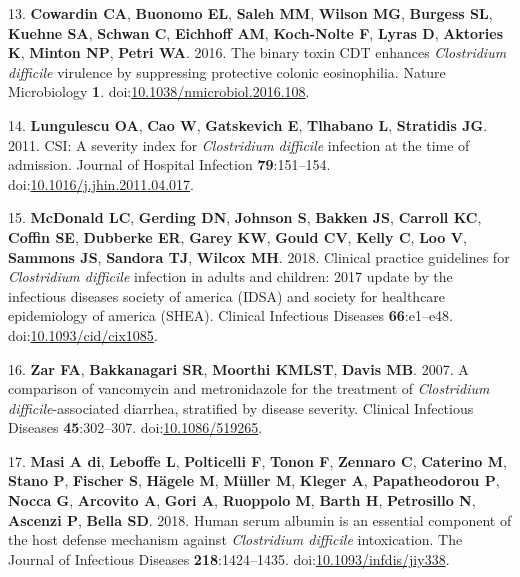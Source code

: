 \documentclass[
  12pt,
]{article}
\newenvironment{cslreferences}%
  {}%
  {\par}
\begin{document}
\begin{cslreferences}
\leavevmode\hypertarget{ref-Cowardin2016}{}%
13. \textbf{Cowardin CA}, \textbf{Buonomo EL}, \textbf{Saleh MM},
\textbf{Wilson MG}, \textbf{Burgess SL}, \textbf{Kuehne SA},
\textbf{Schwan C}, \textbf{Eichhoff AM}, \textbf{Koch-Nolte F},
\textbf{Lyras D}, \textbf{Aktories K}, \textbf{Minton NP}, \textbf{Petri
WA}. 2016. The binary toxin CDT enhances \emph{Clostridium difficile}
virulence by suppressing protective colonic eosinophilia. Nature
Microbiology \textbf{1}.
doi:\href{https://doi.org/10.1038/nmicrobiol.2016.108}{10.1038/nmicrobiol.2016.108}.

\leavevmode\hypertarget{ref-Lungulescu2011}{}%
14. \textbf{Lungulescu OA}, \textbf{Cao W}, \textbf{Gatskevich E},
\textbf{Tlhabano L}, \textbf{Stratidis JG}. 2011. CSI: A severity index
for \emph{Clostridium difficile} infection at the time of admission.
Journal of Hospital Infection \textbf{79}:151--154.
doi:\href{https://doi.org/10.1016/j.jhin.2011.04.017}{10.1016/j.jhin.2011.04.017}.

\leavevmode\hypertarget{ref-McDonald2018}{}%
15. \textbf{McDonald LC}, \textbf{Gerding DN}, \textbf{Johnson S},
\textbf{Bakken JS}, \textbf{Carroll KC}, \textbf{Coffin SE},
\textbf{Dubberke ER}, \textbf{Garey KW}, \textbf{Gould CV},
\textbf{Kelly C}, \textbf{Loo V}, \textbf{Sammons JS}, \textbf{Sandora
TJ}, \textbf{Wilcox MH}. 2018. Clinical practice guidelines for
\emph{Clostridium difficile} infection in adults and children: 2017
update by the infectious diseases society of america (IDSA) and society
for healthcare epidemiology of america (SHEA). Clinical Infectious
Diseases \textbf{66}:e1--e48.
doi:\href{https://doi.org/10.1093/cid/cix1085}{10.1093/cid/cix1085}.

\leavevmode\hypertarget{ref-Zar2007}{}%
16. \textbf{Zar FA}, \textbf{Bakkanagari SR}, \textbf{Moorthi KMLST},
\textbf{Davis MB}. 2007. A comparison of vancomycin and metronidazole
for the treatment of \emph{Clostridium difficile}-associated diarrhea,
stratified by disease severity. Clinical Infectious Diseases
\textbf{45}:302--307.
doi:\href{https://doi.org/10.1086/519265}{10.1086/519265}.

\leavevmode\hypertarget{ref-diMasi2018}{}%
17. \textbf{Masi A di}, \textbf{Leboffe L}, \textbf{Polticelli F},
\textbf{Tonon F}, \textbf{Zennaro C}, \textbf{Caterino M}, \textbf{Stano
P}, \textbf{Fischer S}, \textbf{Hägele M}, \textbf{Müller M},
\textbf{Kleger A}, \textbf{Papatheodorou P}, \textbf{Nocca G},
\textbf{Arcovito A}, \textbf{Gori A}, \textbf{Ruoppolo M}, \textbf{Barth
H}, \textbf{Petrosillo N}, \textbf{Ascenzi P}, \textbf{Bella SD}. 2018.
Human serum albumin is an essential component of the host defense
mechanism against \emph{Clostridium difficile} intoxication. The Journal
of Infectious Diseases \textbf{218}:1424--1435.
doi:\href{https://doi.org/10.1093/infdis/jiy338}{10.1093/infdis/jiy338}.


\end{cslreferences}
\end{document}
